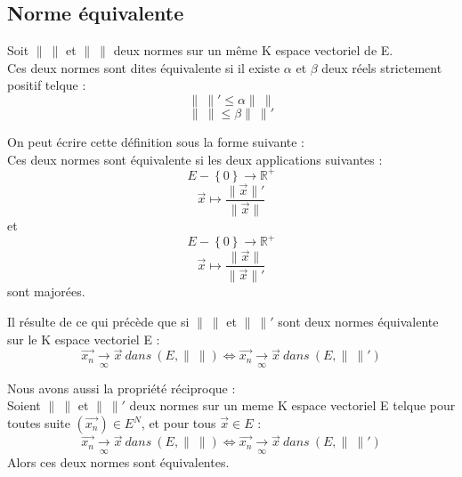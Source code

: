 \subsection{Norme équivalente}
\begin{de}
Soit $\parallel~\parallel$ et $\parallel~\parallel$ deux normes sur un même K espace vectoriel de E.\\
Ces deux normes sont dites équivalente si il existe $\alpha$ et $\beta$ deux réels strictement positif telque : 
$$\parallel~\parallel'\leq\alpha\parallel~\parallel$$
$$\parallel~\parallel \leq \beta \parallel~\parallel'$$ 
\end{de}
\begin{de}
On peut écrire cette définition sous la forme suivante : \\
Ces deux normes sont équivalente si les deux applications suivantes :
$$E - \left\lbrace 0 \right\rbrace \rightarrow \mathbb{R}^+$$
$$\overrightarrow{x} \mapsto \dfrac{\parallel\overrightarrow{x}\parallel'}{\parallel\overrightarrow{x}\parallel}$$
et 
$$E - \left\lbrace 0 \right\rbrace \rightarrow \mathbb{R}^+$$
$$\overrightarrow{x} \mapsto \dfrac{\parallel\overrightarrow{x}\parallel}{\parallel\overrightarrow{x}\parallel'}$$
sont majorées.
\end{de}
\begin{prop}
Il résulte de ce qui précède que si $\parallel~\parallel$ et $\parallel~\parallel'$ sont deux normes équivalente sur le K espace vectoriel E : 
$$\overrightarrow{x_n} \underset{\infty}\rightarrow \overrightarrow{x}~ dans~ (E,\parallel~\parallel) \Leftrightarrow \overrightarrow{x_n} \underset{\infty}\rightarrow \overrightarrow{x}~ dans~ (E,\parallel~\parallel')$$
\end{prop}
\begin{prop}
Nous avons aussi la propriété réciproque :\\
Soient $\parallel~\parallel$ et $\parallel~\parallel'$ deux normes sur un meme K espace vectoriel E telque pour toutes suite $(\overrightarrow{x_n})\in E^N$, et pour tous $\overrightarrow{x}\in E$ :
$$\overrightarrow{x_n} \underset{\infty}\rightarrow \overrightarrow{x}~ dans~ (E,\parallel~\parallel) \Leftrightarrow \overrightarrow{x_n} \underset{\infty}\rightarrow \overrightarrow{x}~ dans~ (E,\parallel~\parallel')$$
Alors ces deux normes sont équivalentes.
\end{prop}
